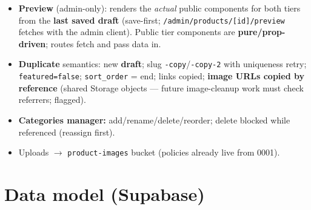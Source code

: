 \documentclass[11pt,a4paper]{article}
\begin{document}
\begin{itemize}
  \item \textbf{Preview} (admin-only): renders the \emph{actual} public components for both
        tiers from the \textbf{last saved draft} (save-first;
        \texttt{/admin/products/[id]/preview} fetches with the admin client). Public tier
        components are \textbf{pure/prop-driven}; routes fetch and pass data in.
  \item \textbf{Duplicate} semantics: new \textbf{draft}; slug \texttt{-copy}/\texttt{-copy-2}
        with uniqueness retry; \texttt{featured=false}; \texttt{sort\_order} = end; links
        copied; \textbf{image URLs copied by reference} (shared Storage objects --- future
        image-cleanup work must check referrers; flagged).
  \item \textbf{Categories manager:} add/rename/delete/reorder; delete blocked while
        referenced (reassign first).
  \item Uploads $\rightarrow$ \texttt{product-images} bucket (policies already live from 0001).
\end{itemize}

\section{Data model (Supabase)}
\end{document}
